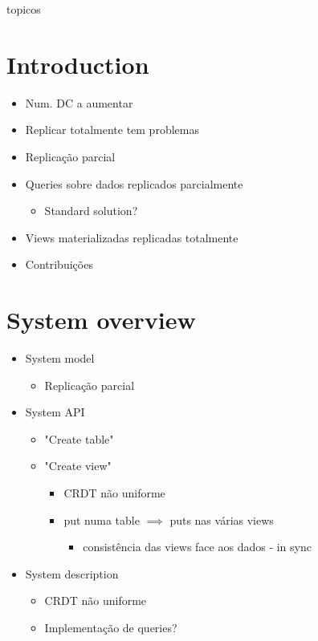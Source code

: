 \documentclass{vldb}
\begin{document}
topicos

\section{Introduction}

\begin{itemize}
	\item Num. DC a aumentar
	\item Replicar totalmente tem problemas
	\item Replicação parcial
	\item Queries sobre dados replicados parcialmente
	\begin{itemize}
		\item Standard solution?
	\end{itemize}
	\item Views materializadas replicadas totalmente
	\item Contribuições
\end{itemize}

\section{System overview}

\begin{itemize}
	\item System model
	\begin{itemize}
		\item Replicação parcial
	\end{itemize}
	\item System API
	\begin{itemize}
		\item "Create table"
		\item "Create view"
		\begin{itemize}
			\item CRDT não uniforme
			\item put numa table $\implies$ puts nas várias views
			\begin{itemize}
				\item consistência das views face aos dados - in sync
			\end{itemize}
		\end{itemize}
	\end{itemize}
	\item System description
	\begin{itemize}
		\item CRDT não uniforme
		\item Implementação de queries?
	\end{itemize}

\end{itemize}
\end{document}
